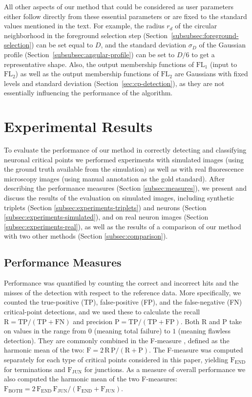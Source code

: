 All other aspects of our method that could be considered as user parameters either follow directly from these essential parameters or are fixed to the standard values mentioned in the text. For example, the radius $r_d$ of the circular neighborhood in the foreground selection step (Section~\ref{subsubsec:foreground-selection}) can be set equal to $D$, and the standard deviation $\sigma_{\!D}$ of the Gaussian profile (Section~\ref{subsubsec:angular-profile}) can be set to $D/6$ to get a representative shape. Also, the output membership functions of $\textrm{FL}_1$ (input to $\textrm{FL}_2$) as well as the output membership functions of $\textrm{FL}_2$ are Gaussians with fixed levels and standard deviation (Section~\ref{sec:cp-detection}), as they are not essentially influencing the performance of the algorithm.

\section{Experimental Results}
\label{sec:experiments}
To evaluate the performance of our method in correctly detecting and classifying neuronal critical points we performed experiments with simulated images (using the ground truth available from the simulation) as well as with real fluorescence microscopy images (using manual annotation as the gold standard). After describing the performance measures (Section \ref{subsec:measures}), we present and discuss the results of the evaluation on simulated images, including synthetic triplets (Section \ref{subsec:experiments-triplets}) and neurons (Section \ref{subsec:experiments-simulated}), and on real neuron images (Section \ref{subsec:experiments-real}), as well as the results of a comparison of our method with two other methods (Section \ref{subsec:comparison}).

\subsection{Performance Measures}
\label{subsec:performance-measures}
Performance was quantified by counting the correct and incorrect hits and the misses of the detection with respect to the reference data. More specifically, we counted the true-positive (TP), false-positive (FP), and the false-negative (FN) critical-point detections, and we used these to calculate the recall $\textrm{R}=\textrm{TP}/(\textrm{TP}+\textrm{FN})$ and precision $\textrm{P}=\textrm{TP}/(\textrm{TP}+\textrm{FP})$. Both R and P take on values in the range from $0$ (meaning total failure) to $1$ (meaning flawless detection). They are commonly combined in the F-measure \cite{Powers-2011}, defined as the harmonic mean of the two: $\textrm{F}=2\,\textrm{R}\,\textrm{P}/(\textrm{R}+\textrm{P})$. The F-measure was computed separately for each type of critical points considered in this paper, yielding $\textrm{F}_{\textrm{END}}$ for terminations and $\textrm{F}_{\textrm{JUN}}$ for junctions. As a measure of overall performance we also computed the harmonic mean of the two F-measures: $\textrm{F}_{\textrm{BOTH}}=2\,\textrm{F}_{\textrm{END}}\,\textrm{F}_{\textrm{JUN}}/(\textrm{F}_{\textrm{END}}+\textrm{F}_{\textrm{JUN}})$.

